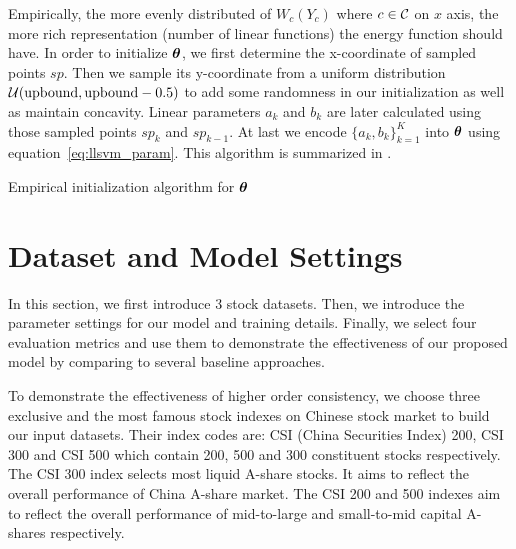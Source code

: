 Empirically, the more evenly distributed of $W_c(Y_c)$ where
$c\in\cal C$ on $x$ axis, the more rich representation (number of
linear functions) the energy function should have. In order to
initialize ${\bm{\theta}}$, we first determine the x-coordinate of
sampled points $sp$. Then we sample its y-coordinate from a
uniform distribution ${\cal
  U}(\text{upbound},\text{upbound}-0.5)$ to add some randomness
in our initialization as well as maintain concavity. Linear
parameters $a_k$ and $b_k$ are later calculated using those
sampled points $sp_k$ and $sp_{k-1}$. At last we encode
$\{a_k,b_k\}_{k=1}^K$ into ${\bm{\theta}}$ using
equation~\eqref{eq:llsvm_param}. This algorithm is summarized in
.

\begin{algorithm}[h]
  \begin{algorithmic}[1]
       
    \ENDIF
    \ENDFOR
     
  \end{algorithmic}
  \caption{\label{alg:init_theta} Empirical initialization
    algorithm for ${\bm{\theta}}$}
\end{algorithm}



\section{Dataset and Model Settings}
\label{sec:dataset}

In this section, we first introduce 3 stock datasets. Then, we
introduce the parameter settings for our model and training
details. Finally, we select four evaluation metrics and use them
to demonstrate the effectiveness of our proposed model by
comparing to several baseline approaches.

To demonstrate the effectiveness of higher order consistency, we
choose three exclusive and the most famous stock indexes on Chinese
stock market to build our input datasets. Their index codes are:
CSI (China Securities Index) 200, CSI 300 and CSI 500 which
contain 200, 500 and 300 constituent stocks respectively. The CSI
300 index selects most liquid A-share stocks. It aims to reflect
the overall performance of China A-share market. The CSI 200 and
500 indexes aim to reflect the overall performance of mid-to-large
and small-to-mid capital A-shares respectively.

